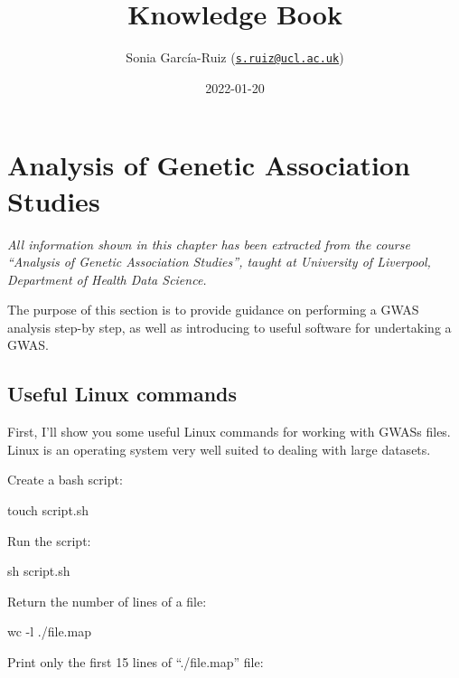 \documentclass[]{book}
\title{Knowledge Book}
\author{Sonia García-Ruiz
(\href{mailto:s.ruiz@ucl.ac.uk}{\nolinkurl{s.ruiz@ucl.ac.uk}})}
\date{2022-01-20}
\newenvironment{Shaded}{\begin{snugshade}}{\end{snugshade}}
\newcommand{\FunctionTok}[1]{\textcolor[rgb]{0.00,0.00,0.00}{#1}}
\newcommand{\NormalTok}[1]{#1}
\begin{document}
\maketitle

{
\setcounter{tocdepth}{1}
\tableofcontents
}
\chapter{Analysis of Genetic Association
Studies}\label{analysis-of-genetic-association-studies}

\emph{All information shown in this chapter has been extracted from the
course ``Analysis of Genetic Association Studies'', taught at University
of Liverpool, Department of Health Data Science.}

The purpose of this section is to provide guidance on performing a GWAS
analysis step-by step, as well as introducing to useful software for
undertaking a GWAS.

\section{Useful Linux commands}\label{useful-linux-commands}

First, I'll show you some useful Linux commands for working with GWASs
files. Linux is an operating system very well suited to dealing with
large datasets.

Create a bash script:

\begin{Shaded}
\begin{Highlighting}[]
\FunctionTok{touch}\NormalTok{ script.sh}
\end{Highlighting}
\end{Shaded}

Run the script:

\begin{Shaded}
\begin{Highlighting}[]
\FunctionTok{sh}\NormalTok{ script.sh}
\end{Highlighting}
\end{Shaded}

Return the number of lines of a file:

\begin{Shaded}
\begin{Highlighting}[]
\FunctionTok{wc}\NormalTok{ -l ./file.map}
\end{Highlighting}
\end{Shaded}

Print only the first 15 lines of ``./file.map'' file:
\end{document}
